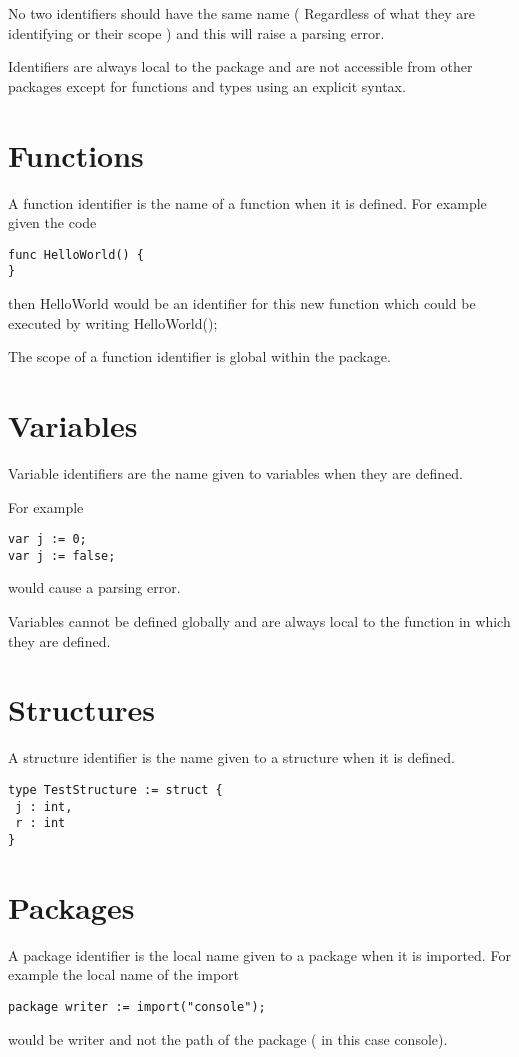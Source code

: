 \documentclass[]{final_report}
\begin{document}
No two identifiers should have the same name ( Regardless of what they are identifying or their scope ) and this will raise a parsing error.

Identifiers are always local to the package and are not accessible from other packages except for functions and types using an explicit syntax.

\section{Functions}

A function identifier is the name of a function when it is defined. For example given the code
\begin{verbatim}
func HelloWorld() {
}
\end{verbatim}
then HelloWorld would be an identifier for this new function which could be executed by writing HelloWorld();

The scope of a function identifier is global within the package.

\section{Variables}

Variable identifiers are the name given to variables when they are defined. 
 
For example 
\begin{verbatim}
var j := 0;
var j := false;
\end{verbatim}
would cause a parsing error.

Variables cannot be defined globally and are always local to the function in which they are defined.

\section{Structures}

A structure identifier is the name given to a structure when it is defined.

\begin{verbatim}
type TestStructure := struct { 
 j : int,
 r : int
}
\end{verbatim}

\section{Packages}

A package identifier is the local name given to a package when it is imported. For example the local name of the import 
\begin{verbatim}
package writer := import("console");
\end{verbatim}
would be writer and not the path of the package ( in this case console).
\end{document}
